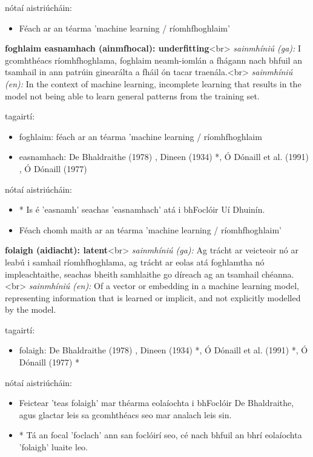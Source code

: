 \documentclass{article}
\begin{document}
nótaí aistriúcháin:
\begin{itemize}
	\item Féach ar an téarma 'machine learning / ríomhfhoghlaim'
\end{itemize}


\textbf{foghlaim easnamhach (ainmfhocal): underfitting}<br>
\textit{sainmhíniú (ga):} I gcomhthéacs ríomhfhoghlama, foghlaim neamh-iomlán a fhágann nach bhfuil an tsamhail in ann patrúin ginearálta a fháil ón tacar traenála.<br>
\textit{sainmhíniú (en):} In the context of machine learning, incomplete learning that results in the model not being able to learn general patterns from the training set.

tagairtí:
\begin{itemize}
	\item foghlaim: féach ar an téarma 'machine learning / ríomhfhoghlaim
	\item easnamhach: De Bhaldraithe (1978) \cite{de-bhaldraithe}, Dineen (1934) \cite{dineen}*, Ó Dónaill et al. (1991) \cite{focloir-beag}, Ó Dónaill (1977) \cite{odonaill}
\end{itemize}

nótaí aistriúcháin:
\begin{itemize}
	\item * Is é 'easnamh' seachas 'easnamhach' atá i bhFoclóir Uí Dhuinín.
	\item Féach chomh maith ar an téarma 'machine learning / ríomhfhoghlaim'
\end{itemize}


\textbf{folaigh (aidiacht): latent}<br>
\textit{sainmhíniú (ga):} Ag trácht ar veicteoir nó ar leabú i samhail ríomhfhoghlama, ag trácht ar eolas atá foghlamtha nó impleachtaithe, seachas bheith samhlaithe go díreach ag an tsamhail chéanna.<br>
\textit{sainmhíniú (en):} Of a vector or embedding in a machine learning model, representing information that is learned or implicit, and not explicitly modelled by the model.

tagairtí:
\begin{itemize}
	\item folaigh: De Bhaldraithe (1978) \cite{de-bhaldraithe}, Dineen (1934) \cite{dineen}*, Ó Dónaill et al. (1991) \cite{focloir-beag}*, Ó Dónaill (1977) \cite{odonaill}*
\end{itemize}

nótaí aistriúcháin:
\begin{itemize}
	\item Feictear 'teas folaigh' mar théarma eolaíochta i bhFoclóir De Bhaldraithe, agus glactar leis sa gcomhthéacs seo mar analach leis sin.
	\item * Tá an focal 'foclach' ann san foclóirí seo, cé nach bhfuil an bhrí eolaíochta 'folaigh' luaite leo.
\end{itemize}
\end{document}
